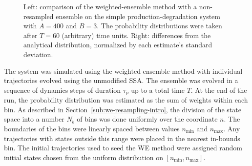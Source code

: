 \documentclass[english,letterpaper,12pt]{report}
\begin{document}
\begin{doublespacing}
\begin{figure}[t]
    \makebox[\linewidth][c]{
        \begin{subfigure}{3in}
            \begin{center}
                
            \end{center}
            \label{sfg:pdwe4-comp}
        \end{subfigure}
        \begin{subfigure}{3in}
            \begin{center}
                
            \end{center}
            \label{sfg:pdwe4-chi}
        \end{subfigure}
    }
    \caption{Left: comparison of the weighted-ensemble method with a non-resampled ensemble on the simple production-degradation system with $A=400$ and $B=3$. The probability distributions were taken after $T=60$ (arbitrary) time units. Right: differences from the analytical distribution, normalized by each estimate's standard deviation.}
    \label{fig:pdwe4}
\end{figure}

The system was simulated using the weighted-ensemble method with individual trajectories evolved using the unmodified SSA. The ensemble was evolved in a sequence of dynamics steps of duration $\tau_p$ up to a total time $T$. At the end of the run, the probability distribution was estimated as the sum of weights within each bin. As described in Section~\ref{sub:we-resampling-intro}, the division of the state space into a number $N_b$ of bins was done uniformly over the coordinate $n$. The boundaries of the bins were linearly spaced between values $n_\text{min}$ and $n_\text{max}$. Any trajectories with states outside this range were placed in the nearest in-bounds bin. The initial trajectories used to seed the WE method were assigned random initial states chosen from the uniform distribution on $[n_\text{min}, n_\text{max}]$.


\end{doublespacing}
\end{document}
